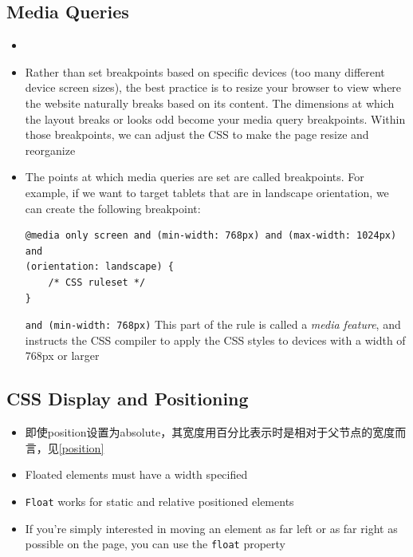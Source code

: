 \documentclass[a4paper, 12pt]{article}
\begin{document}
\subsection{Media Queries}
\begin{itemize}
\item 

\item Rather than set breakpoints based on specific devices (too many different device screen sizes), the best practice is to resize your browser to view where the website naturally breaks based on its content. The dimensions at which the layout breaks or looks odd become your media query breakpoints. Within those breakpoints, we can adjust the CSS to make the page resize and reorganize

\item The points at which media queries are set are called breakpoints. For example, if we want to target tablets that are in landscape orientation, we can create the following breakpoint:
\begin{verbatim}
@media only screen and (min-width: 768px) and (max-width: 1024px) and 
(orientation: landscape) {
    /* CSS ruleset */
}
\end{verbatim}
\verb|and (min-width: 768px)| \textemdash This part of the rule is called a \textit{media feature}, and instructs the CSS compiler to apply the CSS styles to devices with a width of 768px or larger

\end{itemize}

\subsection{CSS Display and Positioning}
\begin{itemize}
\item 即使position设置为absolute，其宽度用百分比表示时是相对于父节点的宽度而言，见\ref{position}

\item Floated elements must have a width specified

\item \verb|Float| works for static and relative positioned elements

\item  If you're simply interested in moving an element as far left or as far right as possible on the page, you can use the \verb|float| property

\end{itemize}	
\end{document}
